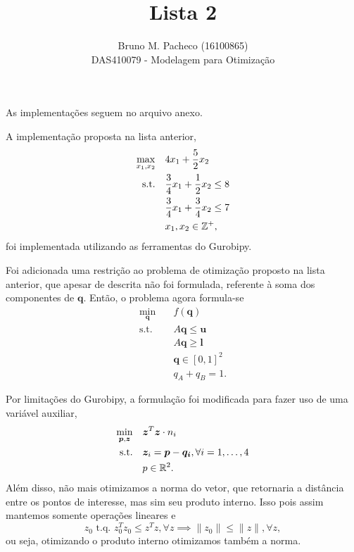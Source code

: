 \documentclass[a4paper]{report}
\begin{document}
 
\title{Lista 2}
\author{Bruno M. Pacheco (16100865)\\
DAS410079 - Modelagem para Otimização}
 
\maketitle
 
As implementações seguem no arquivo anexo.


A implementação proposta na lista anterior,
\begin{align*}
    \max_{x_1,x_2} \quad & 4x_1 + \frac{5}{2}x_2 \\
    \textrm{s.t.} \quad & \frac{3}{4}x_1 + \frac{1}{2}x_2 \le 8 \\
      & \frac{3}{4}x_1 + \frac{3}{4}x_2 \le 7 \\
      & x_1,x_2 \in \mathbb{Z}^{+}
,\end{align*}
foi implementada utilizando as ferramentas do Gurobipy.


Foi adicionada uma restrição ao problema de otimização proposto na lista anterior, que apesar de descrita não foi formulada, referente à soma dos componentes de $\bm{q}$. Então, o problema agora formula-se
\begin{align*}
    \min_{\bm{q}} \quad & f\left( \bm{q} \right)  \\
    \textrm{s.t.} \quad & A\bm{q}\le \bm{u} \\
      & A\bm{q}\ge \bm{l} \\
      & \bm{q} \in \left[ 0,1 \right] ^{2} \\
      & q_A + q_B = 1
.\end{align*}


Por limitações do Gurobipy, a formulação foi modificada para fazer uso de uma variável auxiliar, 
\begin{align*}
    \min_{\bm{p}, \bm{z}} \quad & \bm{z}^{T}\bm{z}\cdot n_i  \\
    \textrm{s.t.} \quad & \bm{z}_i = \bm{p} - \bm{q_i} , \forall i=1,\ldots,4\\
			& p \in \mathbb{R}^{2}
.\end{align*}
Além disso, não mais otimizamos a norma do vetor, que retornaria a distância entre os pontos de interesse, mas sim seu produto interno. Isso pois assim mantemos somente operações lineares e \[
z_0\text{ t.q. } z_0^{T}z_0 \le z^{T}z, \forall z \implies \|z_0\| \le \|z\|, \forall z
,\] ou seja, otimizando o produto interno otimizamos também a norma.
\end{document}

